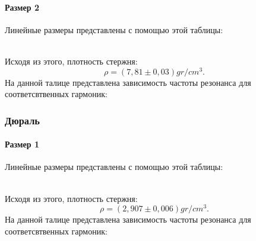 \documentclass[a4paper, 12pt]{article}%
\begin{document}
\paragraph*{Размер 2}
Линейные размеры представлены с помощью этой таблицы:
\begin{table}[h!]
\end{table}
\\Исходя из этого, плотность стержня:
\begin{equation}
\rho=(7,81\pm0,03)gr/cm^3.
\end{equation}
На данной талице представлена зависимость частоты резонанса для соответсвтвенных гармоник:
\begin{table}[h!]
\end{table}
\subsubsection{Дюраль}
\paragraph*{Размер 1}
Линейные размеры представлены с помощью этой таблицы:
\begin{table}[h!]
\end{table}
\\Исходя из этого, плотность стержня:
\begin{equation}
\rho=(2,907\pm0,006)gr/cm^3.
\end{equation}
На данной талице представлена зависимость частоты резонанса для соответсвтвенных гармоник:
\begin{table}[h!]
\end{table}
\end{document}
